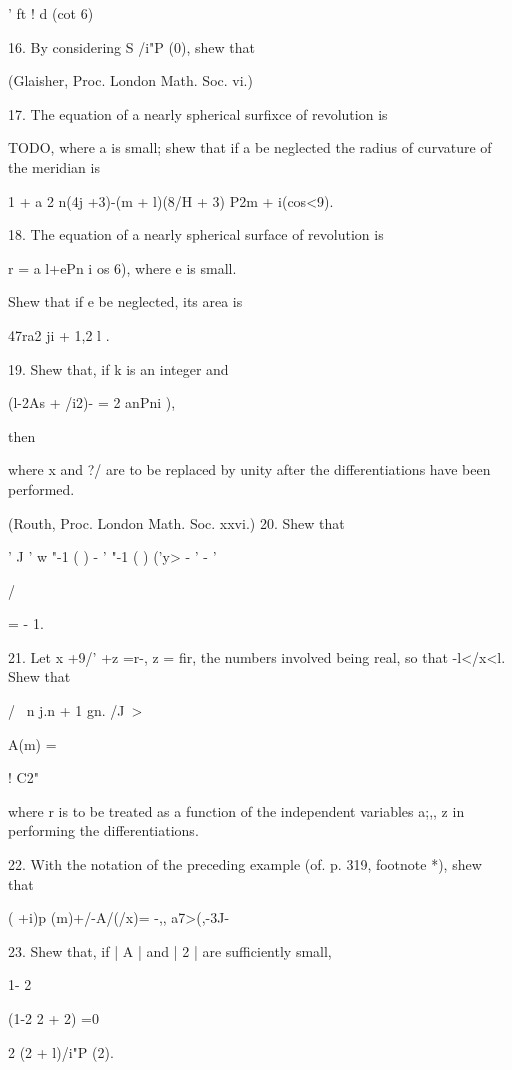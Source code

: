 {{{{' ft ! d (cot 6)

%
%

16. By considering S /i"P (0), shew that

(Glaisher, Proc. London Math. Soc. vi.)

17. The equation of a nearly spherical surfixce of revolution is

TODO, where a is
small; shew that if a be neglected the radius of curvature of the
meridian is

1 + a 2 n(4j +3)-(m + l)(8/H + 3) P2m + i(cos<9).


18. The equation of a nearly spherical surface of revolution is

r = a l+ePn i os 6), where e is small.

Shew that if e be neglected, its area is

47ra2 ji + 1,2 l . 

19. Shew that, if k is an integer and

(l-2As + /i2)- = 2 anPni ),

then

where x and ?/ are to be replaced by unity after the differentiations
have been performed.

(Routh, Proc. London Math. Soc. xxvi.) 20. Shew that

' J ' w "-1 ( ) - ' "-1 ( ) ('y> - ' - '

/

= - 1. 

21. Let x +9/' +z =r-, z = fir, the numbers involved being real, so
that -l</x<l. Shew that

/ \ n j.n + 1 gn. /J~>

A(m) =

  ! C2"

where r is to be treated as a function of the independent variables
a;,, z in performing the differentiations.

22. With the notation of the preceding example (of. p. 319, footnote
*), shew that

( +i)p (m)+/-A/(/x)= -,, a7>(,-3J-

23. Shew that, if | A | and | 2 | are sufficiently small,

1- 2

(1-2 2 + 2) =0

2 (2 + l)/i"P (2).

%
%

}}}}
